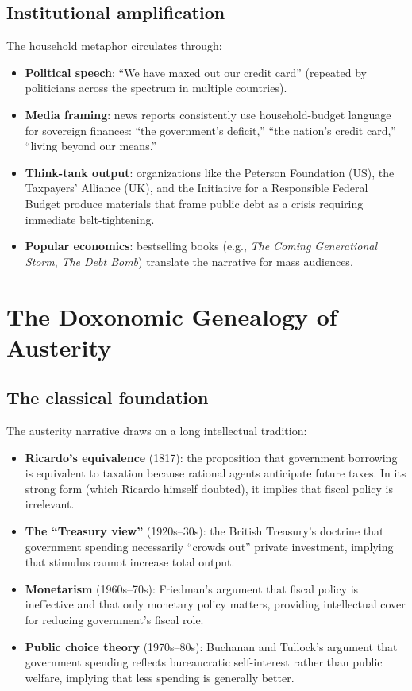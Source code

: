 \subsection{Institutional amplification}

The household metaphor circulates through:
\begin{itemize}[nosep]
  \item \textbf{Political speech}: ``We have maxed out our credit card'' (repeated by politicians across the spectrum in multiple countries).
  \item \textbf{Media framing}: news reports consistently use household-budget language for sovereign finances: ``the government's deficit,'' ``the nation's credit card,'' ``living beyond our means.''
  \item \textbf{Think-tank output}: organizations like the Peterson Foundation (US), the Taxpayers' Alliance (UK), and the Initiative for a Responsible Federal Budget produce materials that frame public debt as a crisis requiring immediate belt-tightening.
  \item \textbf{Popular economics}: bestselling books (e.g., \emph{The Coming Generational Storm}, \emph{The Debt Bomb}) translate the narrative for mass audiences.
\end{itemize}

\section{The Doxonomic Genealogy of Austerity}
\label{sec:ch25-genealogy}

\subsection{The classical foundation}

The austerity narrative draws on a long intellectual tradition:
\begin{itemize}[nosep]
  \item \textbf{Ricardo's equivalence} (1817): the proposition that government borrowing is equivalent to taxation because rational agents anticipate future taxes. In its strong form (which Ricardo himself doubted), it implies that fiscal policy is irrelevant.
  \item \textbf{The ``Treasury view''} (1920s--30s): the British Treasury's doctrine that government spending necessarily ``crowds out'' private investment, implying that stimulus cannot increase total output.
  \item \textbf{Monetarism} (1960s--70s): Friedman's argument that fiscal policy is ineffective and that only monetary policy matters, providing intellectual cover for reducing government's fiscal role.
  \item \textbf{Public choice theory} (1970s--80s): Buchanan and Tullock's argument that government spending reflects bureaucratic self-interest rather than public welfare, implying that less spending is generally better.
\end{itemize}

